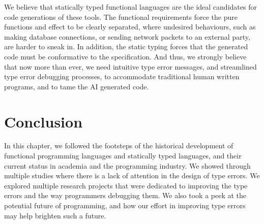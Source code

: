  We believe that statically typed functional languages are the ideal candidates for code generations of these tools. The functional requirements force the pure functions and effect to be clearly separated, where undesired behaviours, such as making database connections, or sending network packets to an external party, are harder to sneak in. In addition, the static typing forces that the generated code must be conformative to the specification. And thus, we strongly believe that now more than ever, we need intuitive type error messages, and streamlined type error debugging processes, to accommodate traditional human written programs, and to tame the AI generated code.


 \section{Conclusion}
 In this chapter, we followed the footsteps of the historical development of functional programming languages and statically typed languages, and their current status in academia and the programming industry. We showed through multiple studies where there is a lack of attention in the design of type errors. We explored multiple research projects that were dedicated to improving the type errors and the way programmers debugging them. We also took a peek at the potential future of programming, and how our effort in improving type errors may help brighten such a future.